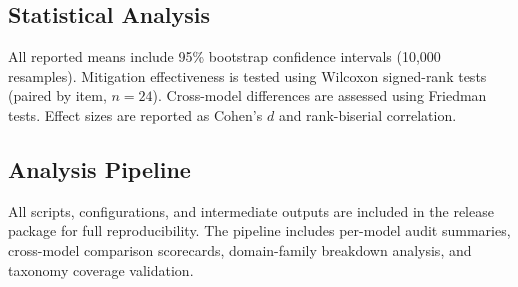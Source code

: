 \subsection{Statistical Analysis}

All reported means include 95\% bootstrap confidence intervals (10,000 resamples). Mitigation effectiveness is tested using Wilcoxon signed-rank tests (paired by item, $n=24$). Cross-model differences are assessed using Friedman tests. Effect sizes are reported as Cohen's $d$ and rank-biserial correlation.

\subsection{Analysis Pipeline}

All scripts, configurations, and intermediate outputs are included in the release package for full reproducibility. The pipeline includes per-model audit summaries, cross-model comparison scorecards, domain-family breakdown analysis, and taxonomy coverage validation.
